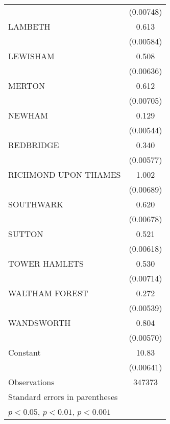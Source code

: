 {\begin{longtable}{l*{1}{c}}
                    &   (0.00748)         \\
\addlinespace
LAMBETH             &       0.613\sym{***}\\
                    &   (0.00584)         \\
\addlinespace
LEWISHAM            &       0.508\sym{***}\\
                    &   (0.00636)         \\
\addlinespace
MERTON              &       0.612\sym{***}\\
                    &   (0.00705)         \\
\addlinespace
NEWHAM              &       0.129\sym{***}\\
                    &   (0.00544)         \\
\addlinespace
REDBRIDGE           &       0.340\sym{***}\\
                    &   (0.00577)         \\
\addlinespace
RICHMOND UPON THAMES&       1.002\sym{***}\\
                    &   (0.00689)         \\
\addlinespace
SOUTHWARK           &       0.620\sym{***}\\
                    &   (0.00678)         \\
\addlinespace
SUTTON              &       0.521\sym{***}\\
                    &   (0.00618)         \\
\addlinespace
TOWER HAMLETS       &       0.530\sym{***}\\
                    &   (0.00714)         \\
\addlinespace
WALTHAM FOREST      &       0.272\sym{***}\\
                    &   (0.00539)         \\
\addlinespace
WANDSWORTH          &       0.804\sym{***}\\
                    &   (0.00570)         \\
\addlinespace
Constant            &       10.83\sym{***}\\
                    &   (0.00641)         \\
\midrule
Observations        &      347373         \\
\bottomrule
\multicolumn{2}{l}{\footnotesize Standard errors in parentheses}\\
\multicolumn{2}{l}{\footnotesize \sym{*} \(p<0.05\), \sym{**} \(p<0.01\), \sym{***} \(p<0.001\)}\\
\end{longtable}
}

